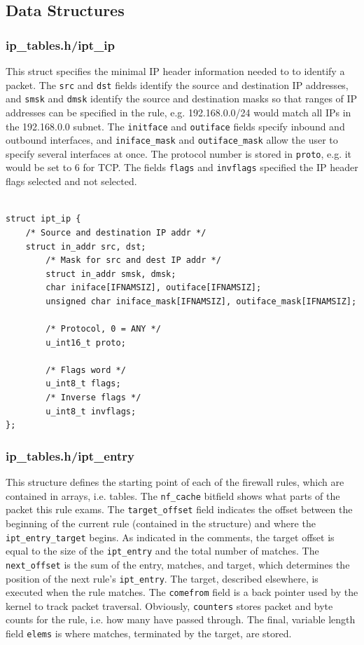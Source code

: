 \documentclass[a4paper,10pt]{article}
\newcommand{\code}[1]{\texttt{{#1}}}
\begin{document}
\subsection{Data Structures}

\subsubsection{ip\_tables.h/ipt\_ip}\label{ipt_ip}

This struct specifies the minimal IP header information needed
to to identify a packet. The \code{src} and \code{dst} fields identify
the source and destination IP addresses, and \code{smsk} and
\code{dmsk} identify the source and destination masks so that ranges
of IP addresses can be specified in the rule, e.g. 192.168.0.0/24
would match all IPs in the 192.168.0.0 subnet\cite{tcpip-illustrated}. The \code{initface} and
\code{outiface} fields specify inbound and outbound interfaces, and
\code{iniface\_mask} and \code{outiface\_mask} allow the user to specify several
interfaces at once. The protocol number is stored in \code{proto},
e.g. it would be set to 6 for TCP. The fields \code{flags} and
\code{invflags} specified the IP header flags selected and not selected.

\begin{lstlisting}

struct ipt_ip {
	/* Source and destination IP addr */
	struct in_addr src, dst;
        /* Mask for src and dest IP addr */
        struct in_addr smsk, dmsk;
        char iniface[IFNAMSIZ], outiface[IFNAMSIZ];
        unsigned char iniface_mask[IFNAMSIZ], outiface_mask[IFNAMSIZ];

        /* Protocol, 0 = ANY */
        u_int16_t proto;

        /* Flags word */
        u_int8_t flags;
        /* Inverse flags */
        u_int8_t invflags;
};

\end{lstlisting}

\subsubsection{ip\_tables.h/ipt\_entry}

This structure defines the starting point of each of the firewall
rules, which are contained in arrays, i.e. tables.  The
\code{nf\_cache} bitfield shows what parts of the packet this rule
exams. The \code{target\_offset} field indicates the offset between
the beginning of the current rule (contained in the structure) and
where the \code{ipt\_entry\_target} begins. As indicated in the
comments, the target offset is equal to the size of the
\code{ipt\_entry} and the total number of matches. The
\code{next\_offset} is the sum of the entry, matches, and target,
which determines the position of the next rule's
\code{ipt\_entry}. The target, described elsewhere, is executed when
the rule matches. The \code{comefrom} field is a back pointer used by
the kernel to track packet traversal. Obviously, \code{counters}
stores packet and byte counts for the rule, i.e. how many have passed
through. The final, variable length field \code{elems} is where matches,
terminated by the target, are stored.
\end{document}
